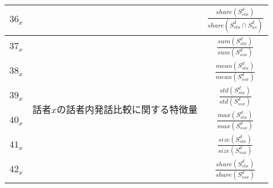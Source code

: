 \begin{table}[htpb]
\begin{tabular}{|c|c|c|}
        $36_{x}$ & & $\frac{share(S^d_{stx})}{share(\overline{S^d_{stx}} \cap S^d_{us})}$ \\ \hline
        $37_{x}$ & \multirow{6}{*}{話者$x$の話者内発話比較に関する特徴量} & $\frac{sum(S^d_{stx})}{sum(S^d_{ssx})}$ \\ \cline{1-1}\cline{3-3}
        $38_{x}$ & & $\frac{mean(S^d_{stx})}{mean(S^d_{ssx})}$ \\ \cline{1-1}\cline{3-3}
        $39_{x}$ & & $\frac{std(S^d_{stx})}{std(S^d_{ssx})}$ \\ \cline{1-1}\cline{3-3}
        $40_{x}$ & & $\frac{max(S^d_{stx})}{max(S^d_{ssx})}$ \\ \cline{1-1}\cline{3-3}
        $41_{x}$ & & $\frac{size(S^d_{stx})}{size(S^d_{ssx})}$ \\ \cline{1-1}\cline{3-3}
        $42_{x}$ & & $\frac{share(S^d_{stx})}{share(S^d_{ssx})}$ \\ \hline
    \end{tabular}
    \label{tab:features_with_comparative_quantities}
\end{table}
  